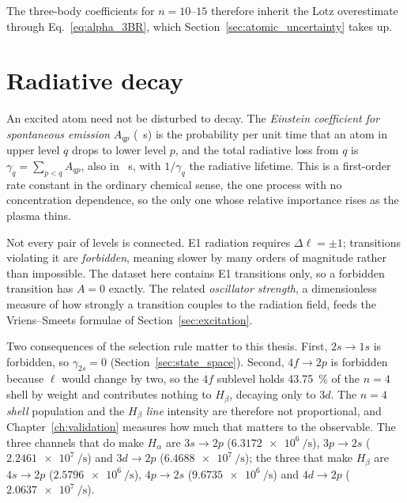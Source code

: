 The three-body coefficients for $n=10$--$15$ therefore inherit the Lotz
overestimate through Eq.~\eqref{eq:alpha_3BR}, which
Section~\ref{sec:atomic_uncertainty} takes up.

\section{Radiative decay}
\label{sec:radiative}

An excited atom need not be disturbed to decay. The \emph{Einstein coefficient
for spontaneous emission} $A_{qp}$ (\si{\per\second}) is the probability per unit
time that an atom in upper level $q$ drops to lower level $p$, and the total
radiative loss from $q$ is $\gamma_q = \sum_{p<q}A_{qp}$, also in
\si{\per\second}, with $1/\gamma_q$ the radiative lifetime. This is a
first-order rate constant in the ordinary chemical sense, the one process with
no concentration dependence, so the only one whose relative importance rises as
the plasma thins.

Not every pair of levels is connected. E1 radiation requires $\Delta\ell = \pm1$;
transitions violating it are \emph{forbidden}, meaning slower by many orders of
magnitude rather than impossible. The dataset here contains E1 transitions only,
so a forbidden transition has $A = 0$ exactly. The related \emph{oscillator
strength}, a dimensionless measure of how strongly a transition couples to the
radiation field, feeds the Vriens--Smeets formulae of
Section~\ref{sec:excitation}.

Two consequences of the selection rule matter to this thesis. First,
$2s \to 1s$ is forbidden, so $\gamma_{2s} = 0$ (Section~\ref{sec:state_space}).
Second, $4f \to 2p$ is forbidden because $\ell$ would change by two, so the $4f$
sublevel holds \SI{43.75}{\percent} of the $n=4$ shell by weight and contributes
nothing to $H_\beta$, decaying only to $3d$. The $n=4$ \emph{shell} population
and the $H_\beta$ \emph{line} intensity are therefore not proportional, and
Chapter~\ref{ch:validation} measures how much that matters to the observable.
The three channels that do make $H_\alpha$ are $3s \to 2p$
($\SI{6.3172e6}{\per\second}$), $3p \to 2s$ ($\SI{2.2461e7}{\per\second}$) and
$3d \to 2p$ ($\SI{6.4688e7}{\per\second}$); the three that make $H_\beta$ are
$4s \to 2p$ ($\SI{2.5796e6}{\per\second}$), $4p \to 2s$
($\SI{9.6735e6}{\per\second}$) and $4d \to 2p$ ($\SI{2.0637e7}{\per\second}$).

